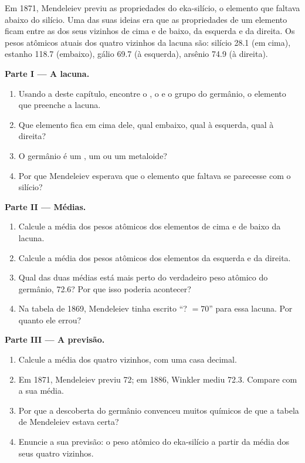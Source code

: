 \begin{problem}
\label{pb:g9:periodic-table-first-look:1}
Em 1871, Mendeleiev previu as propriedades do eka-silício, o elemento
que faltava abaixo do silício. Uma das suas ideias era que as
propriedades de um elemento ficam entre as dos seus vizinhos de cima e
de baixo, da esquerda e da direita. Os pesos atômicos atuais dos quatro
vizinhos da lacuna são: silício 28.1 (em cima), estanho 118.7
(embaixo), gálio 69.7 (à esquerda), arsênio 74.9 (à direita).

\medskip
\noindent\textbf{Parte I --- A lacuna.}
\begin{enumerate}
  \item Usando a  deste capítulo, encontre o , o  e o grupo do germânio, o elemento que preenche
        a lacuna.
  \item Que elemento fica em cima dele, qual embaixo, qual à esquerda,
        qual à direita?
  \item O germânio é um , um  ou um metaloide?
  \item Por que Mendeleiev esperava que o elemento que faltava se
        parecesse com o silício?
\end{enumerate}

\medskip
\noindent\textbf{Parte II --- Médias.}
\begin{enumerate}[resume]
  \item Calcule a média dos pesos atômicos dos elementos de cima e de
        baixo da lacuna.
  \item Calcule a média dos pesos atômicos dos elementos da esquerda e
        da direita.
  \item Qual das duas médias está mais perto do verdadeiro peso atômico
        do germânio, 72.6? Por que isso poderia acontecer?
  \item Na tabela de 1869, Mendeleiev tinha escrito ``? $= 70$'' para
        essa lacuna. Por quanto ele errou?
\end{enumerate}

\medskip
\noindent\textbf{Parte III --- A previsão.}
\begin{enumerate}[resume]
  \item Calcule a média dos quatro vizinhos, com uma casa decimal.
  \item Em 1871, Mendeleiev previu 72; em 1886, Winkler mediu 72.3.
        Compare com a sua média.
  \item Por que a descoberta do germânio convenceu muitos químicos de que
        a tabela de Mendeleiev estava certa?
  \item Enuncie a sua previsão: o peso atômico do eka-silício a partir da
        média dos seus quatro vizinhos.
\end{enumerate}
\end{problem}
